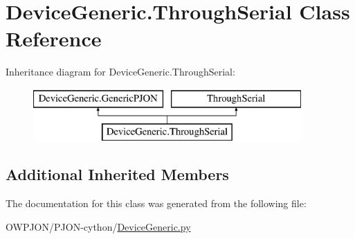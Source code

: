 \hypertarget{classDeviceGeneric_1_1ThroughSerial}{\section{Device\-Generic.\-Through\-Serial Class Reference}
\label{classDeviceGeneric_1_1ThroughSerial}
}
Inheritance diagram for Device\-Generic.\-Through\-Serial\-:\begin{figure}[H]
\begin{center}
\leavevmode
\includegraphics[height=2.000000cm]{classDeviceGeneric_1_1ThroughSerial}
\end{center}
\end{figure}
\subsection*{Additional Inherited Members}


The documentation for this class was generated from the following file\-:\begin{DoxyCompactItemize}
\item 
O\-W\-P\-J\-O\-N/\-P\-J\-O\-N-\/cython/\hyperlink{DeviceGeneric_8py}{Device\-Generic.\-py}\end{DoxyCompactItemize}
